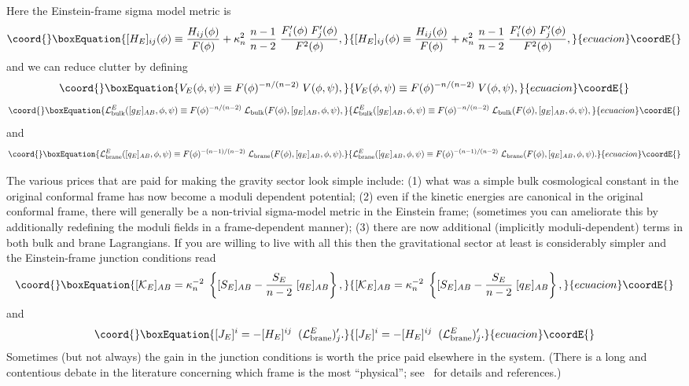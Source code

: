 \documentclass[a4paper,10pt]{article}
\begin{document}
%
Here the Einstein-frame sigma model metric is
%
\begin{equation}\coord{}\boxEquation{
[H_E]_{ij}(\phi)  \equiv
{H_{ij}(\phi) \over F(\phi) } + 
\kappa_n^2 \; {n-1\over n-2} \; {F'_i(\phi)  \; F'_j (\phi) \over F^2(\phi) },
\label{E:sigma-model-metric}
}{
[H_E]_{ij}(\phi)  \equiv
{H_{ij}(\phi) \over F(\phi) } + 
\kappa_n^2 \; {n-1\over n-2} \; {F'_i(\phi)  \; F'_j (\phi) \over F^2(\phi) },
}{ecuacion}\coordE{}\end{equation}
%
and we can reduce clutter by defining
%
\begin{equation}\coord{}\boxEquation{
V_E(\phi,\psi) \equiv F(\phi)^{-n/(n-2)} \; V(\phi,\psi),
}{
V_E(\phi,\psi) \equiv F(\phi)^{-n/(n-2)} \; V(\phi,\psi),
}{ecuacion}\coordE{}\end{equation}
%
%
\begin{equation}\coord{}\boxEquation{
\L_\bulk^E([g_E]_{AB},\phi,\psi) \equiv 
F(\phi)^{-n/(n-2)} \; \L_\bulk(F(\phi),[g_E]_{AB},\phi,\psi),
}{
\L_\bulk^E([g_E]_{AB},\phi,\psi) \equiv 
F(\phi)^{-n/(n-2)} \; \L_\bulk(F(\phi),[g_E]_{AB},\phi,\psi),
}{ecuacion}\coordE{}\end{equation}
%
and
%
\begin{equation}\coord{}\boxEquation{
\L_\brane^E([q_E]_{AB},\phi,\psi) \equiv
F(\phi)^{-(n-1)/(n-2)}\;\L_\brane(F(\phi),[q_E]_{AB},\phi,\psi).
}{
\L_\brane^E([q_E]_{AB},\phi,\psi) \equiv
F(\phi)^{-(n-1)/(n-2)}\;\L_\brane(F(\phi),[q_E]_{AB},\phi,\psi).
}{ecuacion}\coordE{}\end{equation}
%

The various prices that are paid for making the gravity sector look
simple include: (1) what was a simple bulk cosmological constant in
the original conformal frame has now become a moduli dependent
potential; (2) even if the kinetic energies are canonical in the
original conformal frame, there will generally be a non-trivial
sigma-model metric in the Einstein frame; (sometimes you can
ameliorate this by additionally redefining the moduli fields in a
frame-dependent manner); (3) there are now additional (implicitly
moduli-dependent) terms in both bulk and brane Lagrangians. If you are
willing to live with all this then the gravitational sector at least
is considerably simpler and the Einstein-frame junction conditions
read
%
\begin{equation}\coord{}\boxEquation{
[\K_E]_{AB}
=
\kappa_n^{-2} \; \left\{
[S_E]_{AB}-{S_E \over n-2 } \; [q_E]_{AB}
\right\},
\label{E:k-einstein-frame}
}{
[\K_E]_{AB}
=
\kappa_n^{-2} \; \left\{
[S_E]_{AB}-{S_E \over n-2 } \; [q_E]_{AB}
\right\},
}{ecuacion}\coordE{}\end{equation}
%
and
%
\begin{equation}\coord{}\boxEquation{
[J_E]^i= - [H_E]^{ij} \;\; (\L_\brane^E)'_j.
\label{E:j-phi-einstein-frame}
}{
[J_E]^i= - [H_E]^{ij} \;\; (\L_\brane^E)'_j.
}{ecuacion}\coordE{}\end{equation}
%
Sometimes (but not always) the gain in the junction conditions is
worth the price paid elsewhere in the system. (There is a long and
contentious debate in the literature concerning which frame is the
most ``physical''; see~\cite{conformal-frames} for details and
references.)
\end{document}
